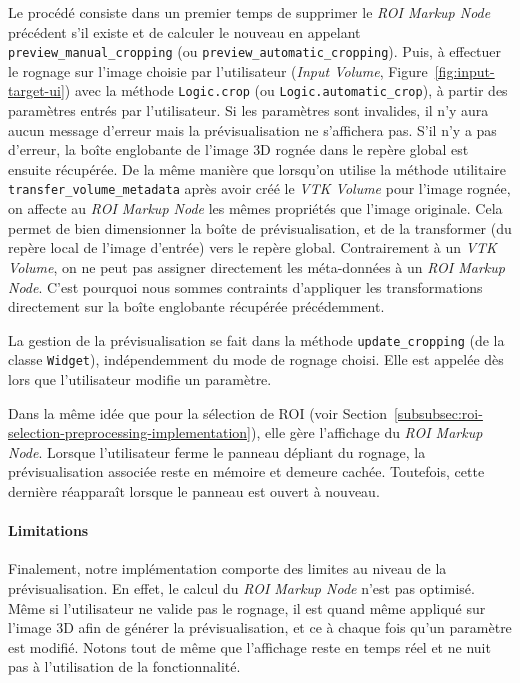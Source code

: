 \documentclass{article}
\newcommand{\subsubsubsection}[1]{\paragraph{#1}\par\noindent\bigskip}
\begin{document}
{{{{                Le procédé consiste dans un premier temps de supprimer le \textit{ROI Markup Node} précédent s'il existe et de calculer le nouveau en appelant \texttt{preview\_manual\_cropping} (ou \texttt{preview\_automatic\_cropping}).
                Puis, à effectuer le rognage sur l'image choisie par l'utilisateur (\textit{Input Volume}, Figure~\ref{fig:input-target-ui}) avec la méthode \texttt{Logic.crop} (ou \texttt{Logic.automatic\_crop}), à partir des paramètres entrés par l'utilisateur.
                Si les paramètres sont invalides, il n'y aura aucun message d'erreur mais la prévisualisation ne s'affichera pas.
                S'il n'y a pas d'erreur, la boîte englobante de l'image 3D rognée dans le repère global est ensuite récupérée. De la même manière que lorsqu'on utilise la méthode utilitaire \texttt{transfer\_volume\_metadata} après avoir créé le \textit{VTK Volume} pour l'image rognée, on affecte au \textit{ROI Markup Node} les mêmes propriétés que l'image originale. Cela permet de bien dimensionner la boîte de prévisualisation, et de la transformer (du repère local de l'image d'entrée) vers le repère global. Contrairement à un \textit{VTK Volume}, on ne peut pas assigner directement les méta-données à un \textit{ROI Markup Node}. C'est pourquoi nous sommes contraints d'appliquer les transformations directement sur la boîte englobante récupérée précédemment.

                \bigskip

                La gestion de la prévisualisation se fait dans la méthode \texttt{update\_cropping} (de la classe \texttt{Widget}), indépendemment du mode de rognage choisi. Elle est appelée dès lors que l'utilisateur modifie un paramètre.

                Dans la même idée que pour la sélection de ROI (voir Section~\ref{subsubsec:roi-selection-preprocessing-implementation}), elle gère l'affichage du \textit{ROI Markup Node}. Lorsque l'utilisateur ferme le panneau dépliant du rognage, la prévisualisation associée reste en mémoire et demeure cachée. Toutefois, cette dernière réapparaît lorsque le panneau est ouvert à nouveau.
            }

            {
                \bigskip
                \subsubsubsection{Limitations}

                Finalement, notre implémentation comporte des limites au niveau de la prévisualisation. En effet, le calcul du \textit{ROI Markup Node} n'est pas optimisé. Même si l'utilisateur ne valide pas le rognage, il est quand même appliqué sur l'image 3D afin de générer la prévisualisation, et ce à chaque fois qu'un paramètre est modifié. Notons tout de même que l'affichage reste en temps réel et ne nuit pas à l'utilisation de la fonctionnalité.

}}}}
\end{document}
